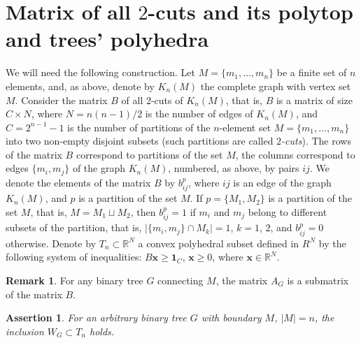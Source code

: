 \documentclass[10pt]{article}
\theoremstyle{plain}
\newtheorem{ass}[thm]{Assertion}
\theoremstyle{definition}
\newtheorem{rk}[thm]{Remark}
\def\one{\mathbf{1}}
\def\bx{\boldsymbol{x}}
\newcommand{\R}{{\mathbb R}}
\begin{document}
\section[Matrix of all $2$-cuts and its polytop]{Matrix of all $2$-cuts and its polytop and trees' polyhedra}
We will need the following construction. Let $M=\{m_1,\ldots,m_n\}$ be a finite set of $n$ elements, and, as above, denote by $K_n(M)$ the complete graph with vertex set $M$. Consider the matrix $B$ of all $2$-cuts of $K_n(M)$, that is, $B$ is a matrix of size $C\times N$, where $N=n(n-1)/2$ is the number of edges of $K_n(M)$, and $C=2^{n-1}-1$ is the number of partitions of the $n$-element set $M=\{m_1,\ldots,m_n\}$ into two non-empty disjoint subsets (such partitions are called \emph{$2$-cuts\/}). The rows of the matrix $B$ correspond to partitions of the set $M$, the columns correspond to edges $\{m_i,m_j\}$ of the graph $K_n(M)$, numbered, as above, by pairs $ij$. We denote the elements of the matrix $B$ by $b_{ij}^p$, where $ij$ is an edge of the graph $K_n(M)$, and $p$ is a partition of the set $M$. If $p=\{M_1,M_2\}$ is a partition of the set $M$, that is, $M=M_1\sqcup M_2$, then $b_{ij}^p=1$ if $m_i$ and $m_j$ belong to different subsets of the partition, that is, $\big|\{m_i,m_j\}\cap M_k\big|=1$, $k=1,\,2$, and $b_{ij}^p=0$ otherwise. Denote by $T_n\subset\R^N$ a convex polyhedral subset defined in $R^N$ by the following system of inequalities: $B\bx\ge\one_C$, $\bx\ge0$, where $\bx\in\R^N$.

\begin{rk}
For any binary tree $G$ connecting $M$, the matrix $A_G$ is a submatrix of the matrix $B$.
\end{rk}

\begin{ass}\label{ass:subset}
For an arbitrary binary tree $G$ with boundary $M$, $|M|=n$, the inclusion $W_G\subset T_n$ holds.
\end{ass}
\end{document}
